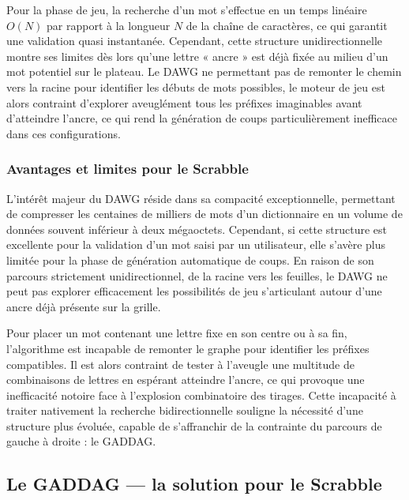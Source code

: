 \documentclass[a4paper]{article}
\begin{document}
Pour la phase de jeu, la recherche d'un mot s'effectue en un temps linéaire $O(N)$ par rapport à la longueur $N$ de la chaîne de caractères, ce qui garantit une validation quasi instantanée. 
Cependant, cette structure unidirectionnelle montre ses limites dès lors qu'une lettre « ancre » est déjà fixée au milieu d'un mot potentiel sur le plateau. 
Le DAWG ne permettant pas de remonter le chemin vers la racine pour identifier les débuts de mots possibles, le moteur de jeu est alors contraint d'explorer aveuglément tous les préfixes imaginables avant d'atteindre l'ancre, ce qui rend la génération de coups particulièrement inefficace dans ces configurations.\newline

\subsubsection{Avantages et limites pour le Scrabble}

L'intérêt majeur du DAWG réside dans sa compacité exceptionnelle, permettant de compresser les centaines de milliers de mots d'un dictionnaire en un volume de données souvent 
inférieur à deux mégaoctets. Cependant, si cette structure est excellente pour la validation d'un mot saisi par un utilisateur, elle s'avère plus limitée pour la phase de 
génération automatique de coups. En raison de son parcours strictement unidirectionnel, de la racine vers les feuilles, le DAWG ne peut pas explorer efficacement les 
possibilités de jeu s'articulant autour d'une ancre déjà présente sur la grille.\newline

Pour placer un mot contenant une lettre fixe en son centre ou à sa fin, l'algorithme est incapable de remonter le graphe pour identifier les préfixes compatibles. Il est alors
 contraint de tester à l'aveugle une multitude de combinaisons de lettres en espérant atteindre l'ancre, ce qui provoque une inefficacité notoire face à l'explosion 
 combinatoire des tirages. Cette incapacité à traiter nativement la recherche bidirectionnelle souligne la nécessité d'une structure plus évoluée, capable de s'affranchir 
 de la contrainte du parcours de gauche à droite : le GADDAG.\newline

\subsection{Le GADDAG — la solution pour le Scrabble}
\end{document}

